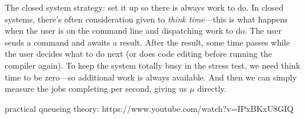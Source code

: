 The closed system strategy: set it up so there is always work to do. In closed systems, there's often consideration given to \textit{think time}---this is what happens when the user is on the command line and dispatching work to do. The user sends a command and awaits a result. After the result, some time passes while the user decides what to do next (or does code editing before running the compiler again). To keep the system totally busy in the stress test, we need think time to be zero---so additional work is always available. And then we can simply measure the jobs completing per second, giving us $\mu$ directly.




practical queueing theory:  https://www.youtube.com/watch?v=IPxBKxU8GIQ
